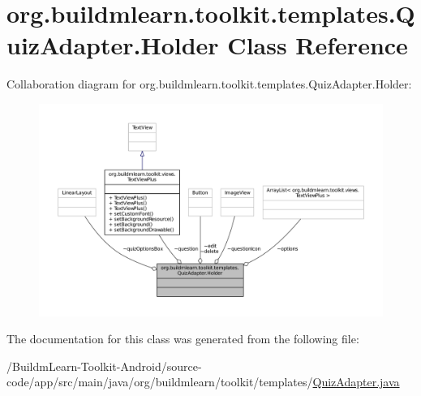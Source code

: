\hypertarget{classorg_1_1buildmlearn_1_1toolkit_1_1templates_1_1QuizAdapter_1_1Holder}{\section{org.\-buildmlearn.\-toolkit.\-templates.\-Quiz\-Adapter.\-Holder Class Reference}
\label{classorg_1_1buildmlearn_1_1toolkit_1_1templates_1_1QuizAdapter_1_1Holder}
}


Collaboration diagram for org.\-buildmlearn.\-toolkit.\-templates.\-Quiz\-Adapter.\-Holder\-:
\nopagebreak
\begin{figure}[H]
\begin{center}
\leavevmode
\includegraphics[width=350pt]{d0/d2e/classorg_1_1buildmlearn_1_1toolkit_1_1templates_1_1QuizAdapter_1_1Holder__coll__graph}
\end{center}
\end{figure}


The documentation for this class was generated from the following file\-:\begin{DoxyCompactItemize}
\item 
/\-Buildm\-Learn-\/\-Toolkit-\/\-Android/source-\/code/app/src/main/java/org/buildmlearn/toolkit/templates/\hyperlink{QuizAdapter_8java}{Quiz\-Adapter.\-java}\end{DoxyCompactItemize}

